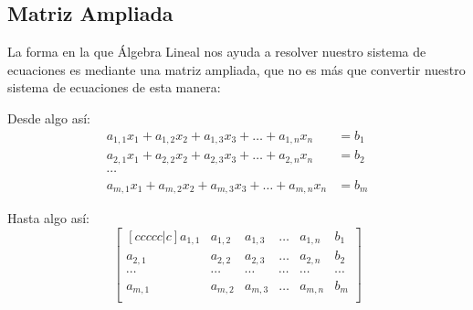 \documentclass[12pt, fleqn]{report}                             %
\theoremstyle{break}                                            %
\begin{document}
            \clearpage
            \subsection{Matriz Ampliada}
                La forma en la que Álgebra Lineal nos ayuda a resolver nuestro sistema de ecuaciones
                es mediante una matriz ampliada, que no es más que convertir nuestro sistema
                de ecuaciones de esta manera:

                Desde algo así:
                \begin{align*}
                    a_{1,1}x_1 + a_{1,2}x_2 + a_{1,3}x_3 + \dots + a_{1,n}x_n &= b_1    \\
                    a_{2,1}x_1 + a_{2,2}x_2 + a_{2,3}x_3 + \dots + a_{2,n}x_n &= b_2    \\
                    \cdots                                                              \\
                    a_{m,1}x_1 + a_{m,2}x_2 + a_{m,3}x_3 + \dots + a_{m,n}x_n &= b_m
                \end{align*}

                Hasta algo así:
                \begin{equation*}
                    \begin{bmatrix}[ccccc|c]
                        a_{1,1} & a_{1,2} & a_{1,3} & \dots  & a_{1,n} & b_1     \\
                        a_{2,1} & a_{2,2} & a_{2,3} & \dots  & a_{2,n} & b_2     \\
                        \cdots  & \cdots  & \cdots  & \cdots & \cdots  & \cdots  \\
                        a_{m,1} & a_{m,2} & a_{m,3} & \dots  & a_{m,n} & b_m     \\
                    \end{bmatrix}
                \end{equation*}


\end{document}
